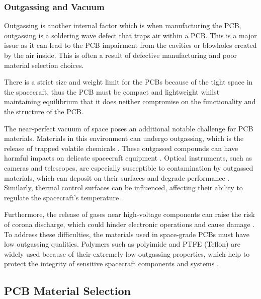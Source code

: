 \subsubsection{Outgassing and Vacuum}


Outgassing is another internal factor which is when manufacturing the PCB, 
outgassing is a soldering wave defect that traps air within a PCB. This is 
a major issue as it can lead to the PCB impairment from the cavities or 
blowholes created by the air inside. This is often a result of defective 
manufacturing and poor material selection choices.

There is a strict size and weight limit for the PCBs because of the tight 
space in the spacecraft, thus the PCB must be compact and lightweight whilst 
maintaining equilibrium that it does neither compromise on the functionality 
and the structure of the PCB.

The near-perfect vacuum of space poses an additional notable challenge for 
PCB materials. Materials in this environment can undergo outgassing, which 
is the release of trapped volatile chemicals \cite{CadenceDesignSystems2025}. 
These outgassed compounds can have harmful impacts on delicate spacecraft 
equipment \cite{FSCircuits2025}. Optical instruments, such as cameras and 
telescopes, are especially susceptible to contamination by outgassed materials, 
which can deposit on their surfaces and degrade performance \cite{Proto-Electronics2024}. 
Similarly, thermal control surfaces can be influenced, affecting their ability 
to regulate the spacecraft's temperature \cite{911EDA2024}.

Furthermore, the release of gases near high-voltage components can raise the 
risk of corona discharge, which could hinder electronic operations and cause 
damage \cite{911EDA2024}. To address these difficulties, the materials used 
in space-grade PCBs must have low outgassing qualities. Polymers such as 
polyimide and PTFE (Teflon) are widely used because of their extremely low 
outgassing properties, which help to protect the integrity of sensitive 
spacecraft components and systems \cite{Proto-Electronics2024}.

\subsection{PCB Material Selection}  %

